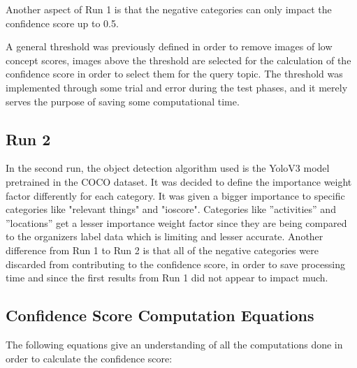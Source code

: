     Another aspect of Run 1 is that the negative categories can only impact the confidence score up to 0.5.
    
    A general threshold was previously defined in order to remove images of low
concept scores, images above the threshold are selected for the calculation of the confidence score in order to select them for the query topic.  The threshold was implemented through some trial and error during the test phases, and it merely serves the purpose of saving some computational time.

    \subsection{Run 2}

    
    In the second run, the object detection algorithm used is the YoloV3 model pretrained in the COCO dataset.  It was decided to define the importance weight factor differently for each category. It was given a bigger importance to specific categories like "relevant things" and "ioscore". Categories like ”activities” and ”locations” get a lesser importance weight factor since they are being compared to the organizers label data which is limiting and lesser accurate.  Another difference from Run 1 to Run 2 is that all of the negative categories were discarded from contributing to the confidence score, in order to save processing time and since the first results from Run 1 did not appear to impact much.
    

\newpage
\subsection{Confidence Score Computation Equations}
\label{sec:equation}
The following equations give an understanding of all the computations done in order to calculate the confidence score:






